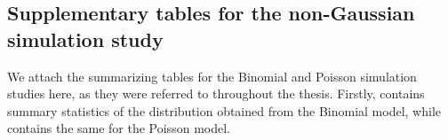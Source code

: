 \subsection*{Supplementary tables for the non-Gaussian simulation study}
We attach the summarizing tables for the Binomial and Poisson simulation studies here, as they were referred to throughout the thesis. Firstly,  contains summary statistics of the distribution obtained from the Binomial model, while  contains the same for the Poisson model.
